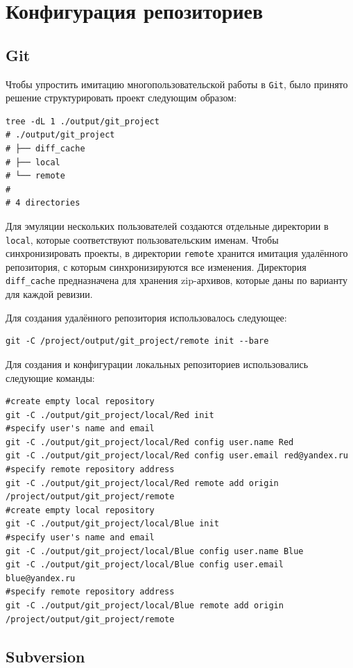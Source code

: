 \section{Конфигурация репозиториев}

\subsection{Git}

Чтобы упростить имитацию многопользовательской работы в \texttt{Git}, было принято решение структурировать проект следующим образом: 
\begin{lstlisting}
tree -dL 1 ./output/git_project
# ./output/git_project
# ├── diff_cache
# ├── local
# └── remote
# 
# 4 directories
\end{lstlisting}

Для эмуляции нескольких пользователей создаются отдельные директории в \texttt{local}, которые соответствуют пользовательским именам. Чтобы синхронизировать проекты, в директории \texttt{remote} хранится имитация удалённого репозитория, с которым синхронизируются все изменения. Директория \texttt{diff\_cache} предназначена для хранения zip-архивов, которые даны по варианту для каждой ревизии.

Для создания удалённого репозитория использовалось следующее:
\begin{lstlisting}
git -C /project/output/git_project/remote init --bare
\end{lstlisting}

Для создания и конфигурации локальных репозиториев использовались следующие команды:
\begin{lstlisting}
#create empty local repository
git -C ./output/git_project/local/Red init
#specify user's name and email
git -C ./output/git_project/local/Red config user.name Red
git -C ./output/git_project/local/Red config user.email red@yandex.ru
#specify remote repository address
git -C ./output/git_project/local/Red remote add origin /project/output/git_project/remote
#create empty local repository
git -C ./output/git_project/local/Blue init
#specify user's name and email
git -C ./output/git_project/local/Blue config user.name Blue
git -C ./output/git_project/local/Blue config user.email blue@yandex.ru
#specify remote repository address
git -C ./output/git_project/local/Blue remote add origin /project/output/git_project/remote
\end{lstlisting}

\subsection{Subversion}

